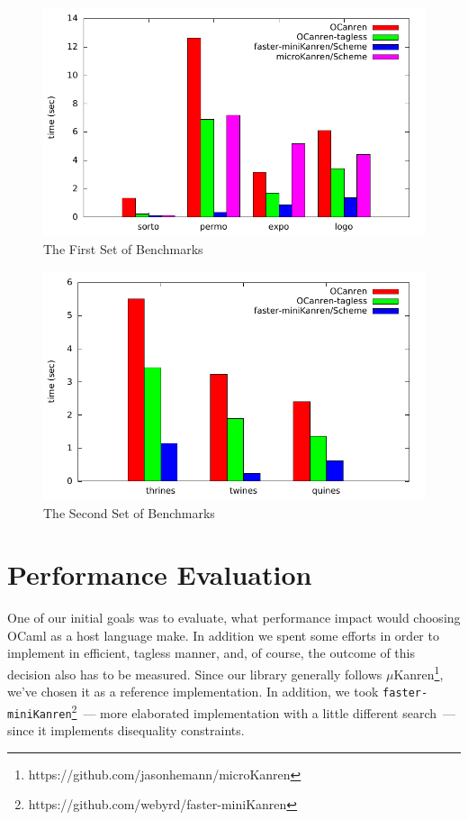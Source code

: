 \begin{figure}[t]
\centering
\includegraphics{graph1.pdf}
\caption{The First Set of Benchmarks}
\label{eval:first}
\end{figure}
\begin{figure}[t]
\centering
\includegraphics{graph2.pdf}
\caption{The Second Set of Benchmarks}
\label{eval:second}
\end{figure}

\section{Performance Evaluation}
\label{sec:evaluation}

One of our initial goals was to evaluate, what performance impact would choosing
OCaml as a host language make. In addition we spent some efforts in order to implement \miniKanren in
efficient, tagless manner, and, of course, the outcome of this decision also has to be measured. 
Since our library generally follows $\mu$Kanren\footnote{https://github.com/jasonhemann/microKanren}, we've chosen it as a reference implementation.
In addition, we took \texttt{faster-miniKanren}\footnote{https://github.com/webyrd/faster-miniKanren}~--- more elaborated 
implementation with a little different search~--- since it implements disequality constraints. 

